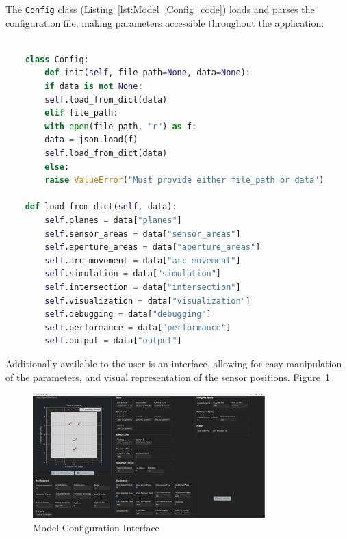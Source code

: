 The \texttt{Config} class (Listing~\ref{lst:Model_Config_code}) loads and parses the configuration file, making parameters accessible throughout the application:
\begin{lstlisting}[style=pythonstyle, caption=Model configuration - Config Class, label=lst:Model_Config_code, language=Python ]
    
    class Config:
        def init(self, file_path=None, data=None):
        if data is not None:
        self.load_from_dict(data)
        elif file_path:
        with open(file_path, "r") as f:
        data = json.load(f)
        self.load_from_dict(data)
        else:
        raise ValueError("Must provide either file_path or data")
    
    def load_from_dict(self, data):
        self.planes = data["planes"]
        self.sensor_areas = data["sensor_areas"]
        self.aperture_areas = data["aperture_areas"]
        self.arc_movement = data["arc_movement"]
        self.simulation = data["simulation"]
        self.intersection = data["intersection"]
        self.visualization = data["visualization"]
        self.debugging = data["debugging"]
        self.performance = data["performance"]
        self.output = data["output"]
    \end{lstlisting}

Additionally available to the user is an interface, allowing for easy manipulation of the parameters, and visual representation of the sensor positions. Figure~\ref{fig:Model Configuration Interface} 

\begin{figure}[htbp] %
    \centering
    \includegraphics[width=0.8\textwidth]{chapters/methodology/SoftwareModel/images/Interface.png} %
    \caption{Model Configuration Interface}       %
    \label{fig:Model Configuration Interface}            %
\end{figure}                             %


